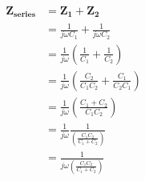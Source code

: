 \documentclass{article}
\begin{document}
    


\begin{align*}
    \mathbf{Z_{\text{series}}} &= \mathbf{Z_1} + \mathbf{Z_2} \\
    &=  \frac{1}{j\omega C_1} + \frac{1}{j\omega C_2} \\
    &= \frac{1}{j\omega} \left( \frac{1}{C_1} + \frac{1}{C_2} \right) \\
    &= \frac{1}{j\omega} \left( \frac{C_2}{C_1 C_2} + \frac{C_1}{C_2 C_1} \right) \\
    &= \frac{1}{j\omega} \left( \frac{C_1 + C_2}{C_1 C_2} \right) \\
    &= \frac{1}{j\omega} \frac{1}{\left( \frac{C_1 C_2}{C_1 + C_2} \right)} \\
    &= \frac{1}{j\omega\left( \frac{C_1 C_2}{C_1 + C_2} \right)}
\end{align*}
\end{document}
